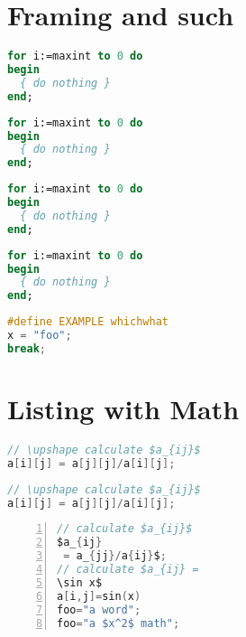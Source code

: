 \documentclass{article}
\begin{document}
\section{Framing and such}
\begin{lstlisting}[language=Pascal,frame=single,rulecolor=\color{red}]
for i:=maxint to 0 do
begin
  { do nothing }
end;
\end{lstlisting}

\begin{lstlisting}[language=Pascal,frameround=tttt,backgroundcolor=\color{yellow}]
for i:=maxint to 0 do
begin
  { do nothing }
end;
\end{lstlisting}
\lstset{backgroundcolor=}
\begin{lstlisting}[language=Pascal,frame=single]
for i:=maxint to 0 do
begin
  { do nothing }
end;
\end{lstlisting}

\begin{lstlisting}[language=Pascal,frame=lines]
for i:=maxint to 0 do
begin
  { do nothing }
end;
\end{lstlisting}

\begin{lstlisting}[language=C,identifierstyle=\slshape,directivestyle=\ttfamily,
caption=A C language listing, frame=lines,backgroundcolor={\color[cmyk]{0,0,0,0.1}}]
#define EXAMPLE whichwhat
x = "foo";
break;
\end{lstlisting}

\section{Listing with Math}
\begin{lstlisting}[language=c,texcl,commentstyle=\color{green}]
// \upshape calculate $a_{ij}$
a[i][j] = a[j][j]/a[i][j];
\end{lstlisting}

\begin{lstlisting}[texcl,language=c]
// \upshape calculate $a_{ij}$
a[i][j] = a[j][j]/a[i][j];
\end{lstlisting}

\begin{lstlisting}[language=c,mathescape,numbers=left,commentstyle=\color{green}]
// calculate $a_{ij}$
$a_{ij}
 = a_{jj}/a{ij}$;
// calculate $a_{ij} = 
\sin x$
a[i,j]=sin(x)
foo="a word";
foo="a $x^2$ math";
\end{lstlisting}
\end{document}
